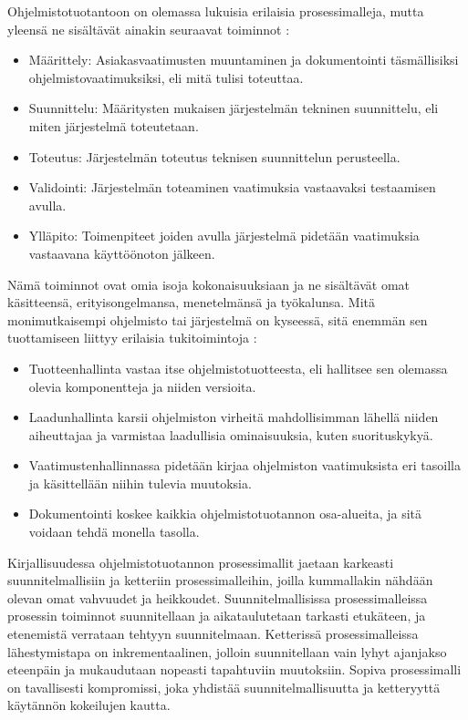 \documentclass[finnish,12pt,a4paper,pdftex]{article}
\begin{document}
Ohjelmistotuotantoon on olemassa lukuisia erilaisia prosessimalleja, mutta yleensä ne sisältävät ainakin seuraavat toiminnot \citep{ohjelmistotuotanto}:

\begin{itemize}
\setlength{\itemsep}{0pt}
    \item Määrittely: Asiakasvaatimusten muuntaminen ja dokumentointi täsmällisiksi ohjelmistovaatimuksiksi, eli mitä tulisi toteuttaa.
    \item Suunnittelu: Määritysten mukaisen järjestelmän tekninen suunnittelu, eli miten järjestelmä toteutetaan.
    \item Toteutus: Järjestelmän toteutus teknisen suunnittelun perusteella.
    \item Validointi: Järjestelmän toteaminen vaatimuksia vastaavaksi testaamisen avulla. 
    \item Ylläpito: Toimenpiteet joiden avulla järjestelmä pidetään vaatimuksia vastaavana käyttöönoton jälkeen.
\end{itemize}

\noindent Nämä toiminnot ovat omia isoja kokonaisuuksiaan ja ne sisältävät omat käsitteensä, erityisongelmansa, menetelmänsä ja työkalunsa. Mitä monimutkaisempi ohjelmisto tai järjestelmä on kyseessä, sitä enemmän sen tuottamiseen liittyy erilaisia tukitoimintoja \citep{okaytannot}:

\begin{itemize}
\setlength{\itemsep}{0pt}
    \item Tuotteenhallinta vastaa itse ohjelmistotuotteesta, eli hallitsee sen olemassa olevia komponentteja ja niiden versioita.
    \item Laadunhallinta karsii ohjelmiston virheitä mahdollisimman lähellä niiden aiheuttajaa ja varmistaa laadullisia ominaisuuksia, kuten suorituskykyä.
    \item Vaatimustenhallinnassa pidetään kirjaa ohjelmiston vaatimuksista eri tasoilla ja käsittellään niihin tulevia muutoksia.
    \item Dokumentointi koskee kaikkia ohjelmistotuotannon osa-alueita, ja sitä voidaan tehdä monella tasolla. 
\end{itemize}

Kirjallisuudessa ohjelmistotuotannon prosessimallit jaetaan karkeasti suunnitelmallisiin ja ketteriin prosessimalleihin, joilla kummallakin nähdään olevan omat vahvuudet ja heikkoudet. Suunnitelmallisissa prosessimalleissa prosessin toiminnot suunnitellaan ja aikataulutetaan tarkasti etukäteen, ja etenemistä verrataan tehtyyn suunnitelmaan. Ketterissä prosessimalleissa lähestymistapa on inkrementaalinen, jolloin suunnitellaan vain lyhyt ajanjakso eteenpäin ja mukaudutaan nopeasti tapahtuviin muutoksiin. Sopiva prosessimalli on tavallisesti kompromissi, joka yhdistää suunnitelmallisuutta ja ketteryyttä käytännön kokeilujen kautta. \citep{sommerville}\\
\end{document}
